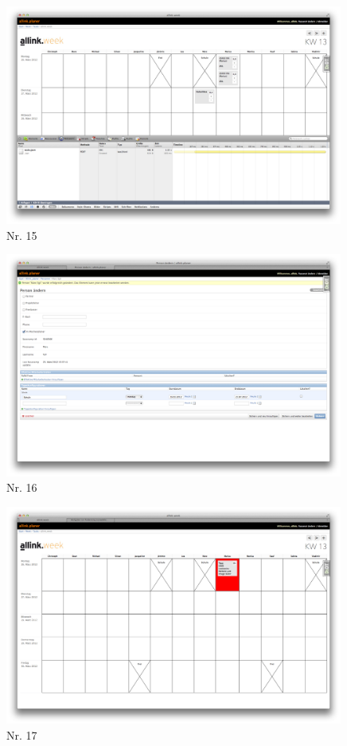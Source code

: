 \begin{figure}[htbp]
    \centering
        \includegraphics[width=0.99\textwidth,angle=0]{bilder/testing/Task_duplizieren.png}
    \caption{Nr. 15}
    \label{fig:bilder_testing_Task_duplizieren}
\end{figure}
\begin{figure}[htbp]
    \centering
        \includegraphics[width=0.99\textwidth,angle=0]{bilder/testing/Sperrtag_start_end.png}
    \caption{Nr. 16}
    \label{fig:bilder_testing_Sperrtag_start_end}
\end{figure}
\begin{figure}[htbp]
    \centering
        \includegraphics[width=0.99\textwidth,angle=0]{bilder/testing/warnmeldung.png}
    \caption{Nr. 17}
    \label{fig:bilder_testing_warnmeldung}
\end{figure}
